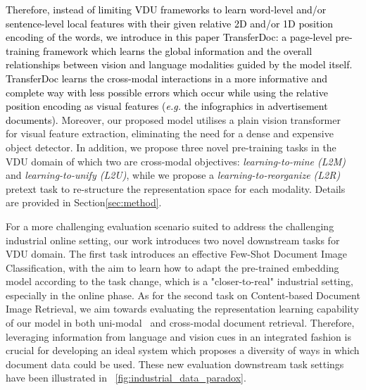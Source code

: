 \documentclass[preprint,review,12pt]{elsarticle}
\newcommand{\eg}{\textit{e.g. }}
\begin{document}
   





\textcolor{black}{Therefore, instead of limiting VDU frameworks to learn word-level and/or sentence-level local features with their given relative 2D and/or 1D position encoding of the words, we introduce in this paper TransferDoc: a page-level pre-training framework which learns the global information and the overall relationships between vision and language modalities guided by the model itself. TransferDoc learns the cross-modal interactions in a more informative and complete way with less possible errors which occur while using the relative position encoding as visual features (\eg the infographics in advertisement documents).} Moreover, our proposed model utilises a plain vision transformer~\cite{dosovitskiy2020image} for visual feature extraction, eliminating the need for a dense and expensive object detector. In addition, we propose three novel pre-training tasks in the VDU domain of which two are cross-modal objectives: \textit{learning-to-mine (L2M)} and \textit{learning-to-unify (L2U)}, while we propose a \textit{learning-to-reorganize (L2R)} pretext task to re-structure the representation space for each modality. Details are provided in Section\ref{sec:method}.





For a more challenging evaluation scenario suited to address the challenging industrial online setting, our work introduces two novel downstream tasks for VDU domain. The first task introduces an effective Few-Shot Document Image Classification, 
with the aim to learn how to adapt the pre-trained embedding model according to the task change, which is a "closer-to-real" industrial setting, especially in the online phase. As for the second task on Content-based Document Image Retrieval, we aim towards evaluating the representation learning capability of our model in both uni-modal~\cite{harley2015evaluation} and cross-modal document retrieval. 
Therefore, leveraging information from language and vision cues in an integrated fashion is crucial for developing an ideal system which proposes a diversity of ways in which document data could be used. These new evaluation downstream task settings have been illustrated in \figurename~\ref{fig:industrial_data_paradox}.
\end{document}
